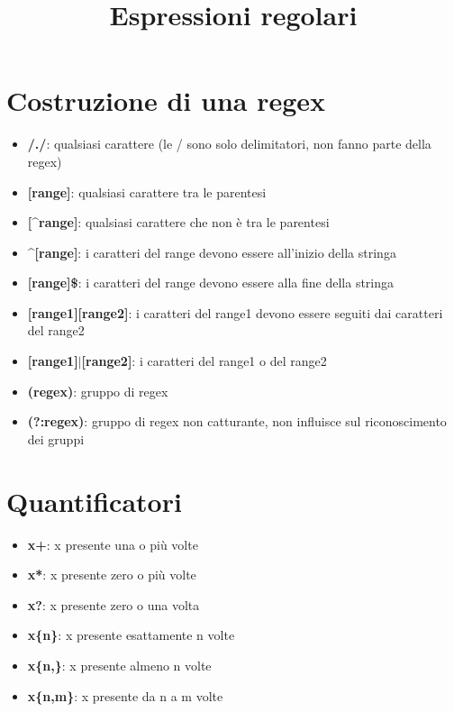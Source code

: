 \documentclass[10pt]{article}
\title{Espressioni regolari}
\author{}
\date{}
\begin{document}
\maketitle
\section{Costruzione di una regex}
\begin{itemize}
    \item \textbf{/./}: qualsiasi carattere (le / sono solo delimitatori, non fanno parte della regex)
    \item \textbf{[range]}: qualsiasi carattere tra le parentesi
    \item \textbf{[\textasciicircum range]}: qualsiasi carattere che non è tra le parentesi
    \item \textbf{\textasciicircum[range]}: i caratteri del range devono essere all'inizio della stringa
    \item \textbf{[range]\$}: i caratteri del range devono essere alla fine della stringa
    \item \textbf{[range1][range2]}: i caratteri del range1 devono essere seguiti dai caratteri del range2
    \item \textbf{[range1]$|$[range2]}: i caratteri del range1 o del range2
    \item \textbf{(regex)}: gruppo di regex
    \item \textbf{(?:regex)}: gruppo di regex non catturante, non influisce sul riconoscimento dei gruppi
\end{itemize}
\section{Quantificatori}
\begin{itemize}
    \item \textbf{x+}: x presente una o più volte
    \item \textbf{x*}: x presente zero o più volte
    \item \textbf{x?}: x presente zero o una volta
    \item \textbf{x\{n\}}: x presente esattamente n volte
    \item \textbf{x\{n,\}}: x presente almeno n volte
    \item \textbf{x\{n,m\}}: x presente da n a m volte
\end{itemize}
\end{document}
